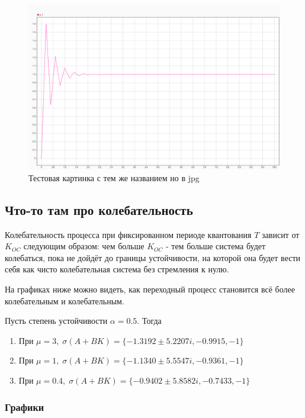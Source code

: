 \begin{figure}[H]
    \centering
\includegraphics[width=1.\linewidth,center]{assets/images/1.jpg}
    \caption{Тестовая картинка с тем же названием но в jpg}
    \label{fig:p1}
\end{figure}


\subsection{Что-то там про колебательность}

Колебательность процесса при фиксированном периоде квантования $T$ зависит от $K_{OC}$ следующим образом: чем больше $K_{OC}$ - тем больше система будет колебаться, пока не дойдёт до границы устойчивости, на которой она будет вести себя как чисто колебательная система без стремления к нулю.

На графиках ниже можно видеть, как переходный процесс становится всё более колебательным и колебательным. 

Пусть степень устойчивости $\alpha = 0.5$. Тогда

\begin{enumerate}
    \item При $\mu = 3, \; \sigma(A+BK) = \{  -1.3192 \pm 5.2207i,  -0.9915, -1\}$
    \item При $\mu = 1, \; \sigma(A+BK) = \{  -1.1340 \pm 5.5547i,  -0.9361, -1\}$
    \item При $\mu = 0.4, \; \sigma(A+BK) = \{  -0.9402 \pm 5.8582i,  -0.7433, -1\}$
\end{enumerate}


\subsubsection{Графики}

